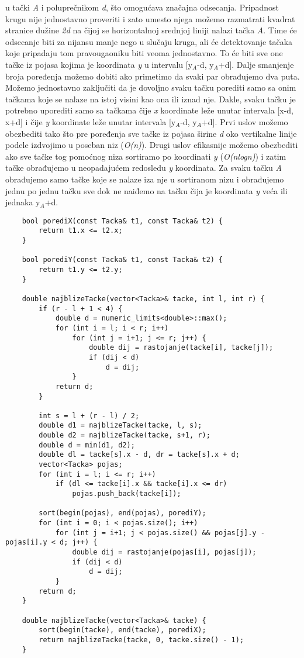 \documentclass{article}
\begin{document}
u tački \textit{A} i poluprečnikom \textit{d}, što omogućava značajna odsecanja. Pripadnost
krugu nije jednostavno proveriti i zato umesto njega možemo razmatrati kvadrat
stranice dužine \textit{2d} na čijoj se horizontalnoj srednjoj liniji nalazi tačka \textit{A}. Time
će odsecanje biti za nijansu manje nego u slučaju kruga, ali će detektovanje
tačaka koje pripadaju tom pravougaoniku biti veoma jednostavno. To će biti
sve one tačke iz pojasa kojima je koordinata \textit{y} u intervalu 
[y$_A$-d, y$_A$+d]. Dalje smanjenje broja poređenja možemo dobiti ako primetimo da svaki par
obrađujemo dva puta. Možemo jednostavno zaključiti da
je dovoljno svaku tačku porediti samo sa onim tačkama koje se nalaze na istoj
visini kao ona ili iznad nje. Dakle, svaku tačku je potrebno uporediti samo sa
tačkama čije \textit{x} koordinate leže unutar intervala [x-d, x+d] i čije \textit{y} koordinate
leže unutar intervala [y$_A$-d, y$_A$+d]. Prvi uslov možemo obezbediti tako što pre
poređenja sve tačke iz pojasa širine \textit{d} oko vertikalne linije podele izdvojimo u
poseban niz (\textit{O(n)}). Drugi
uslov efikasnije možemo obezbediti ako sve tačke tog pomoćnog niza sortiramo po
koordinati \textit{y} (\textit{O(nlogn)}) i zatim tačke obrađujemo
u neopadajućem redosledu \textit{y} koordinata. Za svaku tačku \textit{A} obrađujemo samo
tačke koje se nalaze iza nje u sortiranom nizu i obrađujemo jednu po jednu tačku sve dok ne naiđemo na tačku čija je koordinata \textit{y} veća ili jednaka y$_A$+d.
\begin{lstlisting}
    bool porediX(const Tacka& t1, const Tacka& t2) {
        return t1.x <= t2.x;
    }
    
    bool porediY(const Tacka& t1, const Tacka& t2) {
        return t1.y <= t2.y;
    }
    
    double najblizeTacke(vector<Tacka>& tacke, int l, int r) {
        if (r - l + 1 < 4) {
            double d = numeric_limits<double>::max();
            for (int i = l; i < r; i++)
                for (int j = i+1; j <= r; j++) {
                    double dij = rastojanje(tacke[i], tacke[j]);
                    if (dij < d)
                        d = dij;
                }
            return d;
        }
       
        int s = l + (r - l) / 2;
        double d1 = najblizeTacke(tacke, l, s);
        double d2 = najblizeTacke(tacke, s+1, r);
        double d = min(d1, d2);
        double dl = tacke[s].x - d, dr = tacke[s].x + d;
        vector<Tacka> pojas;
        for (int i = l; i <= r; i++)
            if (dl <= tacke[i].x && tacke[i].x <= dr)
                pojas.push_back(tacke[i]);
        
        sort(begin(pojas), end(pojas), porediY);
        for (int i = 0; i < pojas.size(); i++)
            for (int j = i+1; j < pojas.size() && pojas[j].y - pojas[i].y < d; j++) {
                double dij = rastojanje(pojas[i], pojas[j]);
                if (dij < d)
                    d = dij;
            }
        return d;
    }
    
    double najblizeTacke(vector<Tacka>& tacke) {
        sort(begin(tacke), end(tacke), porediX);
        return najblizeTacke(tacke, 0, tacke.size() - 1);
    }
\end{lstlisting}
\end{document}
